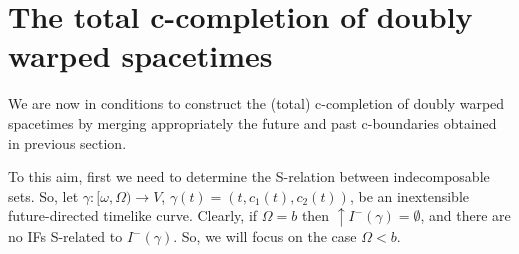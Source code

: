 \section{The total c-completion of doubly warped spacetimes}
\label{sec:totalcompletion}

We are now in conditions to construct the (total) c-completion of doubly warped spacetimes by merging appropriately the future and past c-boundaries obtained in previous section.

To this aim, first we need to determine the S-relation between indecomposable sets. So, let $\gamma:[\omega,\Omega)\rightarrow V$, $\gamma(t)=(t,c_{1}(t),c_{2}(t))$, be an inextensible future-directed timelike curve.
%
%
Clearly, if $\Omega=b$ then $\uparrow I^{-}(\gamma)=\emptyset$, and there are no IFs S-related to $I^{-}(\gamma)$. So, we will focus on the case $\Omega<b$.

